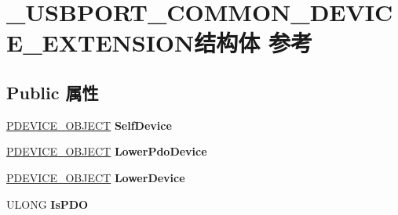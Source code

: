 \hypertarget{struct___u_s_b_p_o_r_t___c_o_m_m_o_n___d_e_v_i_c_e___e_x_t_e_n_s_i_o_n}{}\section{\+\_\+\+U\+S\+B\+P\+O\+R\+T\+\_\+\+C\+O\+M\+M\+O\+N\+\_\+\+D\+E\+V\+I\+C\+E\+\_\+\+E\+X\+T\+E\+N\+S\+I\+O\+N结构体 参考}
\label{struct___u_s_b_p_o_r_t___c_o_m_m_o_n___d_e_v_i_c_e___e_x_t_e_n_s_i_o_n}
\subsection*{Public 属性}
\begin{DoxyCompactItemize}
\item 
\mbox{\label{struct___u_s_b_p_o_r_t___c_o_m_m_o_n___d_e_v_i_c_e___e_x_t_e_n_s_i_o_n_aec0031d22548eea015dae65d7554bcff}} 
\hyperlink{struct___d_e_v_i_c_e___o_b_j_e_c_t}{P\+D\+E\+V\+I\+C\+E\+\_\+\+O\+B\+J\+E\+CT} {\bfseries Self\+Device}
\item 
\mbox{\label{struct___u_s_b_p_o_r_t___c_o_m_m_o_n___d_e_v_i_c_e___e_x_t_e_n_s_i_o_n_ab438ff41ba9e107ebfc7376623b8de4f}} 
\hyperlink{struct___d_e_v_i_c_e___o_b_j_e_c_t}{P\+D\+E\+V\+I\+C\+E\+\_\+\+O\+B\+J\+E\+CT} {\bfseries Lower\+Pdo\+Device}
\item 
\mbox{\label{struct___u_s_b_p_o_r_t___c_o_m_m_o_n___d_e_v_i_c_e___e_x_t_e_n_s_i_o_n_ad239d3bf7a6af47c7982923a3424b3aa}} 
\hyperlink{struct___d_e_v_i_c_e___o_b_j_e_c_t}{P\+D\+E\+V\+I\+C\+E\+\_\+\+O\+B\+J\+E\+CT} {\bfseries Lower\+Device}
\item 
\mbox{\label{struct___u_s_b_p_o_r_t___c_o_m_m_o_n___d_e_v_i_c_e___e_x_t_e_n_s_i_o_n_a22f72891a3b58dfebab9d47dde082da3}} 
U\+L\+O\+NG {\bfseries Is\+P\+DO}
\item 
\mbox{\label{struct___u_s_b_p_o_r_t___c_o_m_m_o_n___d_e_v_i_c_e___e_x_t_e_n_s_i_o_n_ab246e755a9a747c82a93be5d006ddc07}} 

\end{DoxyCompactItemize}

